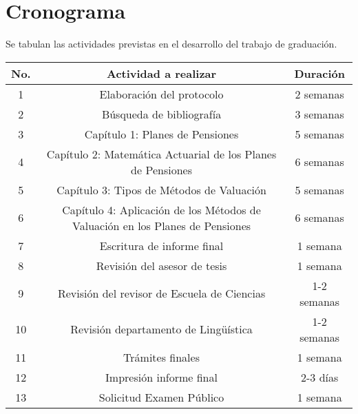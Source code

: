 \documentclass[12pt,letterpaper,titlepage]{article}
\begin{document}
\section{Cronograma}
Se tabulan las actividades previstas en el desarrollo del trabajo de graduación.

\vspace{1cm}

\begin{tabular}{|c|c|c|}
  \hline
   \textbf{No.}  &  \textbf{Actividad a realizar} &  \textbf{Duración }\\ \hline
  1  & Elaboración del protocolo & 2 semanas \\
  2  & Búsqueda de bibliografía & 3 semanas \\
  3  & Capítulo 1: Planes de Pensiones  & 5 semanas \\
  4  & Capítulo 2: Matemática Actuarial de los Planes de Pensiones & 6 semanas \\
  5  & Capítulo 3: Tipos de Métodos de Valuación & 5 semanas \\
  6  & Capítulo 4: Aplicación de los Métodos de Valuación en los Planes de Pensiones & 6 semanas \\
  7  & Escritura de informe final & 1 semana \\
  8  & Revisión del asesor de tesis & 1 semana \\
  9 & Revisión del revisor de Escuela de Ciencias & 1-2 semanas \\
  10 & Revisión departamento de Lingüística & 1-2 semanas \\
  11 & Trámites finales & 1 semana  \\
  12 & Impresión informe final & 2-3 días \\
  13 & Solicitud Examen Público & 1 semana \\
  \hline
\end{tabular}

\newpage
\end{document}
